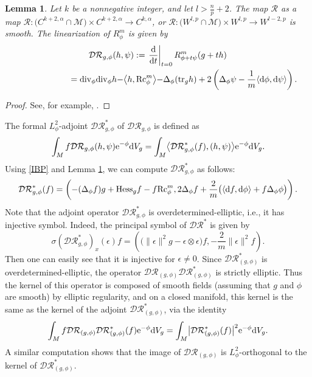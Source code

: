 \documentclass[10pt,a4paper]{amsart}
\numberwithin{equation}{section}
\newtheorem{Lemma}[Theorem]{Lemma}
\begin{document}
\begin{Lemma}\label{lem3.1}
Let $k$ be a nonnegative integer, and let $l>\frac{n}{p}+2$. The map $\mathcal{R}$ as a map $\mathcal{R}\colon\bigl(C^{k+2,\alpha}\cap \mathcal{M}\bigr)\times C^{k+2,\alpha}\to C^{k,\alpha}$, or $\mathcal{R}\colon\bigl(W^{l,p}\cap \mathcal{M}\bigr)\times W^{l,p}\to W^{l-2,p}$ is smooth. The linearization of $R_\phi^m$ is given by
\begin{gather*}
\mathcal{DR}_{g,\phi}(h,\psi):=\left.\frac{{\rm d}}{{\rm d}t}\right|_{t=0}R_{\phi+t\psi}^m(g+th)\\
\hphantom{\mathcal{DR}_{g,\phi}(h,\psi):}={\rm div}_\phi {\rm div}_\phi h-\bigr\langle h,{\rm Rc}_\phi^m\bigl\rangle -\Delta_\phi({\rm tr}_gh)+2\left(\Delta_\phi \psi-\frac{1}{m}\langle {\rm d}\phi,{\rm d}\psi\rangle\right).
\end{gather*}
\end{Lemma}
\begin{proof}
See, for example, \cite[Proposition 5.1]{Case2}.
\end{proof}

The formal $L^2_\phi$-adjoint $\mathcal{DR}_{g,\phi}^*$ of $\mathcal{DR}_{g,\phi}$ is defined as
\[
\int_M f \mathcal{DR}_{g,\phi}(h,\psi) {\rm e}^{-\phi}{\rm d}V_g=\int_M \bigl\langle \mathcal{DR}_{g,\phi}^*(f), (h,\psi)\bigr\rangle {\rm e}^{-\phi}{\rm d}V_g.
\]
Using \eqref{IBP} and Lemma \ref{lem3.1}, we can compute $\mathcal{DR}_{g,\phi}^*$ as follows:
\begin{equation*}%
 \begin{split}
 \mathcal{DR}^*_{g,\phi}(f)=\left(-(\Delta_\phi f)g+{\rm Hess}_gf-f{\rm Rc}_\phi^m,2\Delta_\phi f+\frac{2}{m}\bigl(\langle {\rm d}f,{\rm d}\phi\rangle+f\Delta_\phi\phi\bigr)\right).
 \end{split}
\end{equation*}
Note that the adjoint operator $\mathcal{DR}_{g,\phi}^*$ is overdetermined-elliptic, i.e., it has injective symbol. Indeed, the principal symbol of $\mathcal{DR}^*$ is given by
\begin{equation*}
 \sigma(\mathcal{DR}_{g,\phi}^*)_x(\epsilon)f=\left(\bigl(\|\epsilon\|^2g-\epsilon\otimes \epsilon\bigr)f,-\frac{2}{m}\|\epsilon\|^2f\right).
\end{equation*}
Then one can easily see that it is injective for $\epsilon\neq0$. Since $\mathcal{DR}_{(g,\phi)}^*$ is overdetermined-elliptic, the operator $\mathcal{DR}_{(g,\phi)}\mathcal{DR}^*_{(g,\phi)}$ is strictly elliptic. Thus the kernel of this operator is composed of smooth fields (assuming that $g$ and $\phi$ are smooth) by elliptic regularity, and on a closed manifold, this kernel is the same as the kernel of the adjoint $\mathcal{DR}_{(g,\phi)}^*$, via the identity
\[
\int_M f\mathcal{DR}_{(g,\phi)}\mathcal{DR}_{(g,\phi)}^*(f){\rm e}^{-\phi}{\rm d}V_g=\int_M \bigl|\mathcal{DR}_{(g,\phi)}^*(f)\bigr|^2{\rm e}^{-\phi}{\rm d}V_g.
\]
 A similar computation shows that the image of $\mathcal{DR}_{(g,\phi)}$ is $L^2_\phi$-orthogonal to the kernel of $\mathcal{DR}_{(g,\phi)}^*$.
\end{document}
